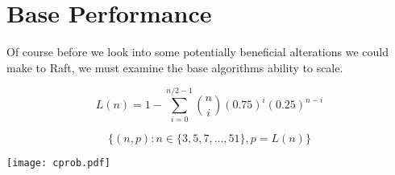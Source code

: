 \section{Base Performance}

Of course before we look into some potentially beneficial alterations we could make to Raft, we must examine the base algorithms ability to scale.

\[L(n) = 1- \sum_{i=0}^{n/2-1} {n \choose i}(0.75)^{i}(0.25)^{n-i}\]


\[\{(n, p): n \in \{3,5,7,...,51\}, p=L(n)\}\]


\texttt{[image: cprob.pdf]}